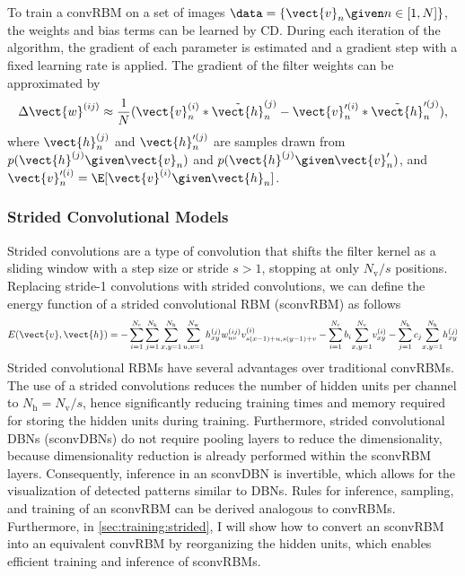 To train a convRBM on a set of images $\data = \{\vect{v}_n \given n \in
[1,N]\}$, the weights and bias terms can be learned by CD. During each iteration
of the algorithm, the gradient of each parameter is estimated and a gradient
step with a fixed learning rate is applied. The gradient of the filter weights
can be approximated by
\begin{equation}
\Delta \vect{w}^{(ij)} \approx
\frac{1}{N}(\vect{v}^{(i)}_n*\tilde{\vect{h}}^{(j)}_n -
\vect{v}'^{(i)}_n*\tilde{\vect{h}}_n'^{(j)}),
\end{equation}
where $\vect{h}_n^{(j)}$ and $\vect{h}'^{(j)}_n$ are samples drawn from
$p(\vect{h}^{(j)} \given \vect{v}_n)$ and $p(\vect{h}^{(j)} \given
\vect{v}'_n)$, and $\vect{v}'^{(i)}_n = \E[\vect{v}^{(i)} \given \vect{h}_n]$.

\subsubsection{Strided Convolutional Models}


Strided convolutions are a type of convolution that shifts the filter kernel as
a sliding window with a step size or stride $s > 1$, stopping at only
$N_\text{v} / s$ positions. Replacing stride-1 convolutions with strided
convolutions, we can define the energy function of a strided convolutional RBM
(sconvRBM) as follows
\begin{equation} 
E(\vect{v},\vect{h}) = 
-\sum_{i=1}^{N_\text{c}}\sum_{j=1}^{N_\text{k}}\sum_{x,y=1}^{N_\text{h}}
\sum_{u,v=1}^{N_\text{w}}
h_{xy}^{(j)} w_{uv}^{(ij)}v_{s(x-1)+u, s(y-1)+v}^{(i)} -
\sum_{i=1}^{N_\text{c}}b_i\!\sum_{x,y = 1}^{N_\text{v}}\!v_{xy}^{(i)} -
\sum_{j=1}^{N_\text{k}}c_j\!\sum_{x,y = 1}^{N_\text{h}}\!h_{xy}^{(j)}
\end{equation}
Strided convolutional RBMs have several advantages over traditional convRBMs.
The use of a strided convolutions reduces the number of hidden units per channel
to $N_\text{h} = N_\text{v} / s$, hence significantly reducing training times
and memory required for storing the hidden units during training. Furthermore,
strided convolutional DBNs (sconvDBNs) do not require pooling layers to
reduce the dimensionality, because dimensionality reduction is already performed
within the sconvRBM layers. Consequently, inference in an sconvDBN is
invertible, which allows for the visualization of detected patterns similar to
DBNs. Rules for inference, sampling, and training of an sconvRBM can be derived
analogous to convRBMs. Furthermore, in \ref{sec:training:strided}, I will show
how to convert an sconvRBM into an equivalent convRBM by reorganizing the hidden
units, which enables efficient training and inference of sconvRBMs.

